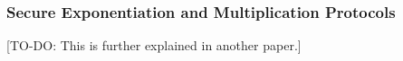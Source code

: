 \subsubsection{Secure Exponentiation and Multiplication Protocols}
\label{ssec:exponentiationprotocol}
[TO-DO: This is further explained in another paper.]




